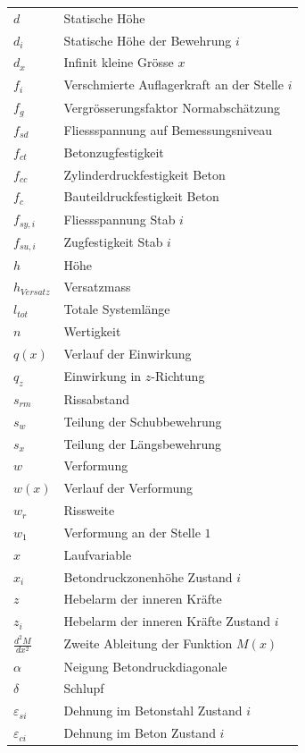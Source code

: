 \documentclass[
  12pt,
  letterpaper,
  egregdoesnotlikesansseriftitles]{scrreprt}
\begin{document}
\begin{longtable}[]{@{}
  >{\raggedright\arraybackslash}p{}
  >{\raggedright\arraybackslash}p{}@{}}
\(d\) & Statische Höhe \\
\(d_i\) & Statische Höhe der Bewehrung \(i\) \\
\(d_x\) & Infinit kleine Grösse \(x\) \\
\(f_i\) & Verschmierte Auflagerkraft an der Stelle \(i\) \\
\(f_g\) & Vergrösserungsfaktor Normabschätzung \\
\(f_{sd}\) & Fliessspannung auf Bemessungsniveau \\
\(f_{ct}\) & Betonzugfestigkeit \\
\(f_{cc}\) & Zylinderdruckfestigkeit Beton \\
\(f_c\) & Bauteildruckfestigkeit Beton \\
\(f_{sy,i}\) & Fliessspannung Stab \(i\) \\
\(f_{su,i}\) & Zugfestigkeit Stab \(i\) \\
\(h\) & Höhe \\
\(h_{Versatz}\) & Versatzmass \\
\(l_{tot}\) & Totale Systemlänge \\
\(n\) & Wertigkeit \\
\(q(x)\) & Verlauf der Einwirkung \\
\(q_z\) & Einwirkung in \(z\)-Richtung \\
\(s_{rm}\) & Rissabstand \\
\(s_w\) & Teilung der Schubbewehrung \\
\(s_x\) & Teilung der Längsbewehrung \\
\(w\) & Verformung \\
\(w(x)\) & Verlauf der Verformung \\
\(w_r\) & Rissweite \\
\(w_1\) & Verformung an der Stelle \(1\) \\
\(x\) & Laufvariable \\
\(x_i\) & Betondruckzonenhöhe Zustand \(i\) \\
\(z\) & Hebelarm der inneren Kräfte \\
\(z_i\) & Hebelarm der inneren Kräfte Zustand \(i\) \\
\(\frac{d^2M}{dx^2}\) & Zweite Ableitung der Funktion \(M(x)\) \\
\(\alpha\) & Neigung Betondruckdiagonale \\
\(\delta\) & Schlupf \\
\(\varepsilon_{si}\) & Dehnung im Betonstahl Zustand \(i\) \\
\(\varepsilon_{ci}\) & Dehnung im Beton Zustand \(i\) \\

\end{longtable}
\end{document}
